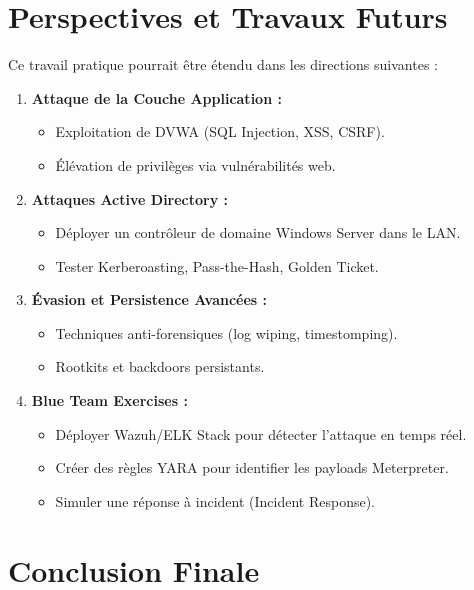 \documentclass[12pt,a4paper,openany]{report}
\begin{document}
	\section{Perspectives et Travaux Futurs}
	
	Ce travail pratique pourrait être étendu dans les directions suivantes :
	
	\begin{enumerate}
		\item \textbf{Attaque de la Couche Application :}
		\begin{itemize}
			\item Exploitation de DVWA (SQL Injection, XSS, CSRF).
			\item Élévation de privilèges via vulnérabilités web.
		\end{itemize}
		
		\item \textbf{Attaques Active Directory :}
		\begin{itemize}
			\item Déployer un contrôleur de domaine Windows Server dans le LAN.
			\item Tester Kerberoasting, Pass-the-Hash, Golden Ticket.
		\end{itemize}
		
		\item \textbf{Évasion et Persistence Avancées :}
		\begin{itemize}
			\item Techniques anti-forensiques (log wiping, timestomping).
			\item Rootkits et backdoors persistants.
		\end{itemize}
		
		\item \textbf{Blue Team Exercises :}
		\begin{itemize}
			\item Déployer Wazuh/ELK Stack pour détecter l'attaque en temps réel.
			\item Créer des règles YARA pour identifier les payloads Meterpreter.
			\item Simuler une réponse à incident (Incident Response).
		\end{itemize}
	\end{enumerate}
	
	\section{Conclusion Finale}
	
\end{document}
